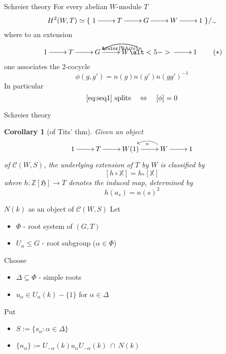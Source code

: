 \documentclass[pdf]{beamer}
\newcommand{\bbf}[1]{\mathds{#1}}
\newcommand{\Z}{\bbf{Z}}
\newcommand{\X}{\bbf{X}}
\newtheorem*{cor*}{Corollary}
\begin{document}
\begin{frame}{Schreier theory}
   \pause For every abelian $W$-module $T$\pause
   \[ H^2(W,T) \simeq \{ \xymatrix{ 1 \ar[r] & T \ar[r] & G \ar[r] & W \ar[r] & 1  } \}/_\sim \]
   \pause where to an extension 
   \begin{equation}\label{eq:seq1} \xymatrix{ 1 \ar[r] & T \ar[r] & G \ar[r] & W \ar[r] \alt<5->{\ar@/_1.2em/[l]^n}{\ar@[white]@/_1.2em/[l]^{\color{white}n}} & 1 } \tag{$\ast$} \end{equation}
   \pause[6] one associates the $2$-cocycle
   \[ \phi(g,g') = n(g)n(g')n(gg')^{-1} \]
   \pause In particular
   \[ \text{\eqref{eq:seq1} splits} \quad \Leftrightarrow\quad [\phi] = 0 \]
\end{frame}

\begin{frame}{Schreier theory}
   \begin{cor*}[of Tits' thm]
      Given an object
      \[ \xymatrix{ 1 \ar[r] & T \ar[r] & W(1) \ar[r] & W \ar[r] \ar@/_1.2em/[l]^n & 1 } \]
      of $\mathcal{C}(W,S)$\pause , the underlying extension of $T$ by $W$ is classified by\pause
      \[ [h\circ \X] = h_\ast [\X] \]
      \pause where $h: \Z[\mathfrak{H}] \rightarrow T$ denotes the induced map\pause , determined by
      \[ h(a_s) = n(s)^2 \]
   \end{cor*}
\end{frame}

\begin{frame}{$N(k)$ as an object of $\mathcal{C}(W,S)$}
   \pause Let
   \begin{itemize}
      \item<2-> $\Phi$ - root system of $(G,T)$
      \item<3-> $U_\alpha \leq G$ - root subgroup \pause ($\alpha \in \Phi$)
   \end{itemize}
   \pause Choose
   \begin{itemize}
      \item<5-> $\Delta \subseteq \Phi$ - simple roots
      \item<6-> $u_\alpha \in U_\alpha(k)-\{1\}$ for $\alpha \in \Delta$
   \end{itemize}
   \pause[7] Put
   \begin{itemize}
      \item<8-> $S := \{ s_\alpha : \alpha \in \Delta \}$ 
      \item<10-> $\{n_\alpha\} := U_{-\alpha}(k)u_\alpha U_{-\alpha}(k)\ \cap\ N(k)$
   \end{itemize}
\end{frame}
\end{document}

